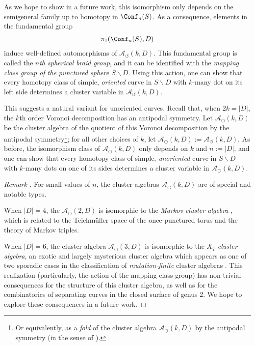 \documentclass[11pt,oneside]{amsart}
\theoremstyle{definition}
\theoremstyle{remark}
\newenvironment{rem}{\refstepcounter{thm}\begin{proof}[Remark \emph{\thethm}]\renewcommand*{\qedsymbol}{\(\blacksquare\)}}{\end{proof}}
\numberwithin{equation}{section}
\begin{document}
As we hope to show in a future work, this isomorphism only depends on the semigeneral family up to homotopy in $\Conf_n(S)$. As a consequence, elements in the fundamental group
\[
\pi_1(\Conf_n(S),D)
\]
induce well-defined automorphisms of $\mathcal{A}_\circlearrowleft(k,D)$. This fundamental group is called the \emph{$n$th spherical braid group}, and it can be identified with the \emph{mapping class group of the punctured sphere $S\smallsetminus D$}. Using this action, one can show that every homotopy class of simple, \emph{oriented} curve in $S\smallsetminus D$ with $k$-many dot on its left side determines a cluster variable in $\mathcal{A}_\circlearrowleft(k,D)$.%


This suggests a natural variant for unoriented curves. Recall that, when $2k=|D|$, the $k$th order Voronoi decomposition has an antipodal symmetry. Let $\mathcal{A}_\bigcirc(k,D)$ be the cluster algebra of the quotient of this Voronoi decomposition by the antipodal symmetry\footnote{Or equivalently, as a \emph{fold} of the cluster algebra $\mathcal{A}_\circlearrowleft(k,D)$ by the antipodal symmetry (in the sense of \cite{Dup08}).}; for all other choices of $k$, let $\mathcal{A}_\bigcirc(k,D) :=\mathcal{A}_\circlearrowleft(k,D)$.  As before, the isomorphism class of $\mathcal{A}_\bigcirc(k,D)$ only depends on $k$ and $n:=|D|$, and one can show that every homotopy class of simple, \emph{unoriented} curve in $S\smallsetminus D$ with $k$-many dots on one of its sides determines a cluster variable in $\mathcal{A}_\bigcirc(k,D)$.

\begin{rem}
For small values of $n$, the cluster algebras $\mathcal{A}_\bigcirc(k,D)$ are of special and notable types. 

When $|D|=4$, the $\mathcal{A}_\bigcirc(2,D)$ is isomorphic to the \emph{Markov cluster algebra} \cite{BFZ05}, which is related to the Teichm\"uller space of the once-punctured torus and the theory of Markov triples. 

When $|D|=6$, the cluster algebra $\mathcal{A}_\bigcirc(3,D)$ is isomorphic to the \emph{$X_7$ cluster algebra}, an exotic and largely mysterious cluster algebra which appears as one of two sporadic cases in the classification of \emph{mutation-finite} cluster algebras \cite{DO08}. This realization (particularly, the action of the mapping class group) has non-trivial consequences for the structure of this cluster algebra, as well as for the combinatorics of separating curves in the closed surface of genus 2. We hope to explore these consequences in a future work.
\end{rem}
\end{document}

